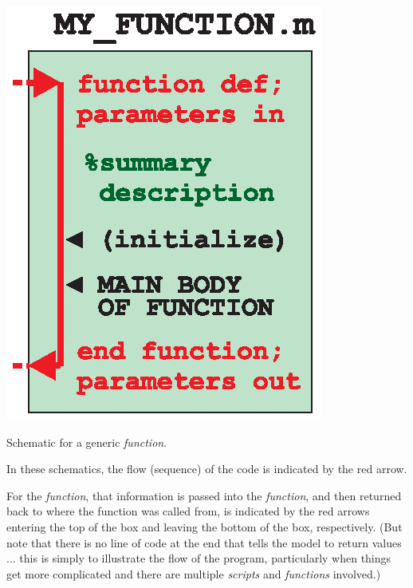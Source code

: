 \documentclass{tufte-book} %
\begin{document}
\begin{marginfigure}[-0.0in]
\includegraphics[width=\linewidth]{ch0-function.eps}
\caption{Schematic for a generic \textit{function}.}
\label{fig:ch0-function}
\end{marginfigure}

In these schematics, the flow (sequence) of the code is indicated by the red arrow. 

For the \textit{function}, that information is passed into the \textit{function}, and then returned back to where the function was called from, is indicated by the red arrows entering the top of the box and leaving the bottom of the box, respectively. (But note that there is no line of code at the end that tells the model to return values ... this is simply to illustrate the flow of the program, particularly when things get more complicated and there are multiple \textit{scripts} and \textit{functions} involved.)
\end{document}
